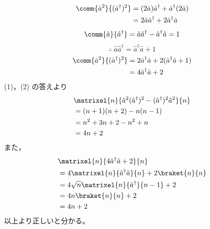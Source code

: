 \begin{align*}
\comm{\hat{a}^{2}}{(\hat{a}^{\dagger})^{2}}&=(2\hat{a})\hat{a}^{\dagger}+\hat{a}^{\dagger}(2\hat{a})\\
&=2\hat{a}\hat{a}^{\dagger}+2\hat{a}^{\dagger}\hat{a}
\end{align*}
\[ \comm{\hat{a}}{\hat{a}^{\dagger}}=\hat{a}\hat{a}^{\dagger}-\hat{a}^{\dagger}\hat{a}=1 \]
\[ \therefore\ \hat{a}\hat{a}^{\dagger}=\hat{a}^{\dagger}\hat{a}+1 \]
\begin{align*}
\comm{\hat{a}^{2}}{(\hat{a}^{\dagger})^{2}}&=2\hat{a}^{\dagger}\hat{a}+2(\hat{a}^{\dagger}\hat{a}+1)\\
&=4\hat{a}^{\dagger}\hat{a}+2
\end{align*}
(1)，(2) の答えより
\begin{align*}
&\matrixel{n}{\hat{a}^{2}(\hat{a}^{\dagger})^{2}-(\hat{a}^{\dagger})^{2}\hat{a}^{2}}{n}\\
&=(n+1)(n+2)-n(n-1)\\
&=n^{2}+3n+2-n^{2}+n\\
&=4n+2
\end{align*}
また，
\begin{align*}
&\matrixel{n}{4\hat{a}^{\dagger}\hat{a}+2}{n}\\
&=4\matrixel{n}{\hat{a}^{\dagger}\hat{a}}{n}+2\braket{n}{n}\\
&=4\sqrt{n}\matrixel{n}{\hat{a}^{\dagger}}{n-1}+2\\
&=4n\braket{n}{n}+2\\
&=4n+2
\end{align*}
以上より正しいと分かる。
